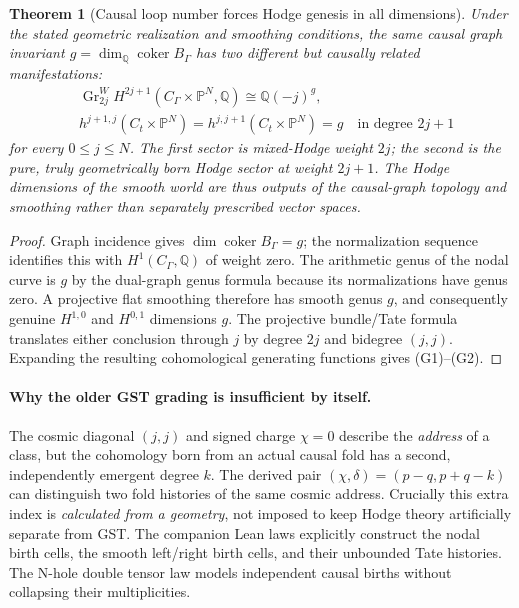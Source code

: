 \documentclass[11pt]{article}
\newtheorem{theorem}{Theorem}
\begin{document}
\begin{theorem}[Causal loop number forces Hodge genesis in all dimensions]
Under the stated geometric realization and smoothing conditions, the
same causal graph invariant $g=\dim_{\mathbb Q}\operatorname{coker}
B_\Gamma$ has two different but causally related manifestations:
\[
\begin{aligned}
&\operatorname{Gr}^W_{2j}H^{2j+1}
 (C_\Gamma\times\mathbb P^N,\mathbb Q)
 \cong\mathbb Q(-j)^g,\\
&h^{j+1,j}(C_t\times\mathbb P^N)
 =h^{j,j+1}(C_t\times\mathbb P^N)=g
 \quad\text{in degree }2j+1
\end{aligned}
\]
for every $0\le j\le N$. The first sector is mixed-Hodge
weight $2j$; the second is the \emph{pure}, truly
geometrically born Hodge sector at weight $2j+1$.
The Hodge dimensions of the smooth world are thus
\emph{outputs of the causal-graph topology and smoothing}
rather than separately prescribed vector spaces.
\end{theorem}
\begin{proof}
Graph incidence gives $\dim\operatorname{coker}B_\Gamma=g$;
the normalization sequence identifies this with
$H^1(C_\Gamma,\mathbb Q)$ of weight zero.
The arithmetic genus of the nodal curve is $g$ by the
dual-graph genus formula because its normalizations have genus zero.
A projective flat smoothing therefore has smooth genus $g$,
and consequently genuine $H^{1,0}$ and $H^{0,1}$ dimensions $g$.
The projective bundle/Tate formula translates either conclusion
through $j$ by degree $2j$ and bidegree $(j,j)$.
Expanding the resulting cohomological generating functions gives
(G1)--(G2).
\end{proof}

\paragraph{Why the older GST grading is insufficient by itself.}
The cosmic diagonal $(j,j)$ and signed charge $\chi=0$
describe the \emph{address} of a class, but the cohomology born
from an actual causal fold has a second, independently emergent
degree $k$. The derived pair
\((\chi,\delta)=(p-q,p+q-k)\)
can distinguish two fold histories of the same cosmic address.
Crucially this extra index is \emph{calculated from a geometry},
not imposed to keep Hodge theory artificially separate from GST.
The companion Lean laws explicitly construct the nodal birth
cells, the smooth left/right birth cells, and their unbounded
Tate histories. The N-hole double tensor law models independent
causal births without collapsing their multiplicities.
\end{document}
